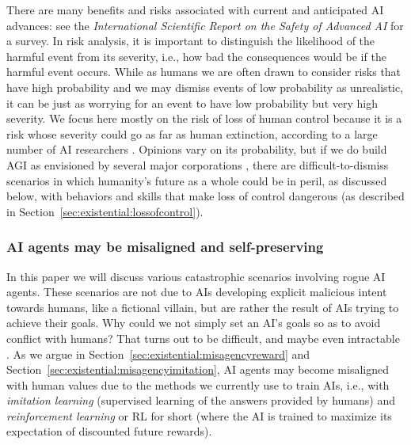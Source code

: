 There are many benefits and risks associated with current and anticipated AI advances: see the \textit{International Scientific Report on the Safety of Advanced AI} \cite{www.gov.uk.government.publications.international.ai.safety.report.2025} for a survey. In risk analysis, it is important to distinguish the likelihood of the harmful event from its severity, i.e., how bad the consequences would be if the harmful event occurs. While as humans we are often drawn to consider risks that have high probability and we may dismiss events of low probability as unrealistic, it can be just as worrying for an event to have low probability but very high severity. We focus here mostly on the risk of loss of human control because it is a risk whose severity could go as far as human extinction, according to a large number of AI researchers \cite{www.safe.ai.work.statement.on.ai.risk,arxiv.org.abs.2401.02843}. Opinions vary on its probability, but if we do build AGI as envisioned by several major corporations \cite{openai.com.index.planning.for.agi.and.beyond,deepmind.google.about}, there are difficult-to-dismiss scenarios in which humanity's future as a whole could be in peril, as discussed below, with behaviors and skills that make loss of control dangerous (as described in Section~\ref{sec:existential:lossofcontrol}).
    
    \subsubsection{AI agents may be misaligned and self-preserving}
    \label{sec:existential:riskseverity:selfpres}

In this paper we will discuss various catastrophic scenarios involving rogue AI agents. These scenarios are not due to AIs developing explicit malicious intent towards humans, like a fictional villain, but are rather the result of AIs trying to achieve their goals. Why could we not simply set an AI's goals so as to avoid conflict with humans? That turns out to be difficult, and maybe even intractable \cite{en.wikipedia.org.wiki.Superintelligence..Paths..Dangers..Strategies, en.wikipedia.org.wiki.Human.Compatible}. As we argue in Section~\ref{sec:existential:misagencyreward} and Section~\ref{sec:existential:misagencyimitation}, AI agents may become misaligned with human values due to the methods we currently use to train AIs, i.e., with \textit{imitation learning} (supervised learning of the answers provided by humans) and \textit{reinforcement learning} or RL for short (where the AI is trained to maximize its expectation of discounted future rewards).


